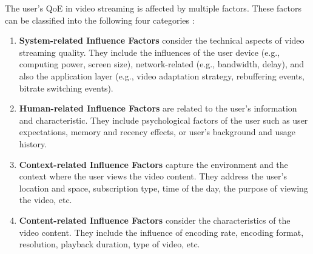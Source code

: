 The user's QoE in video streaming is affected by multiple factors.
These factors can be classified into the following four categories \citep{Survey_QoEModeling, EffectSizesOfInfluenceFactors}:


\begin{enumerate}
  \item \textbf{System-related Influence Factors}
  consider the technical aspects of video streaming quality.
  They include the influences of the user device (e.g., computing power, screen size), network-related (e.g., bandwidth, delay), and also the application layer (e.g., video adaptation strategy, rebuffering events, bitrate switching events).


  \item \textbf{Human-related Influence Factors}
  are related to the user's information and characteristic.
  They include psychological factors of the user such as user expectations, memory and recency effects, or user's background and usage history.
  
  
  \item \textbf{Context-related Influence Factors}
  capture the environment and the context where the user views the video content.
  They address the user's location and space, subscription type, time of the day, the purpose of viewing the video, etc.
  
  
  \item \textbf{Content-related Influence Factors}
  consider the characteristics of the video content.
  They include the influence of encoding rate, encoding format, resolution, playback duration, type of video, etc.
\end{enumerate}